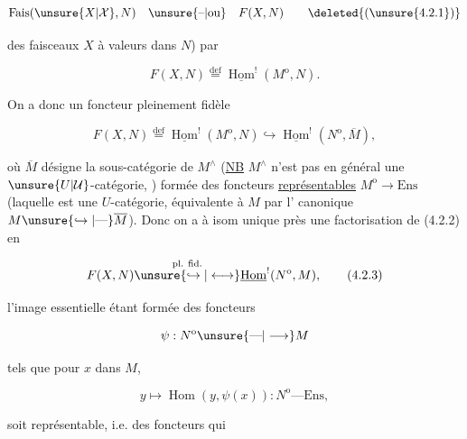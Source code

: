 
\[
\operatorname{Fais}(\unsure{X|\mathcal X},N)\quad\unsure{\text{--}|\text{ou}}\quad F(X,N)
\tag*{\deleted{(\unsure{4.2.1})}}
\]

des faisceaux  $X$ à valeurs dans $N$) par

\[
F(X,N)\overset{\mathrm{def}}{=}\underline{\operatorname{Hom}}^{!}(M^{\mathrm{o}},N).
\tag*{(4.2.1)}
\]

On a donc un foncteur pleinement fidèle

\[
F(X,N)\overset{\mathrm{def}}{=}\underline{\operatorname{Hom}}^{!}(M^{\mathrm{o}},N)
\hookrightarrow\underline{\operatorname{Hom}}^{!}(N^{\mathrm{o}},\overline M),
\tag*{(4.2.2)}
\]

où $\overline M$ désigne la sous-catégorie de $M^{\wedge}$ (\uline{NB} $M^{\wedge}$ n'est pas en général une $\unsure{U|\mathcal U}$-catégorie, ) formée des foncteurs \uline{représentables}  $M^{\mathrm{o}}\to\mathrm{Ens}$ (laquelle est une $U$-catégorie, équivalente à $M$ par l' canonique $M\unsure{\hookrightarrow|\text{---}}\overline M$). Donc on a à isom unique près une factorisation de (4.2.2) en

\[
F(X,N)\overset{\text{pl. fid.}}{\unsure{\hookrightarrow|\longleftrightarrow}}
\underline{\operatorname{Hom}}^{!}(N^{\mathrm{o}},M),
\tag*{(4.2.3)}
\]

l'image essentielle étant formée des foncteurs

\[
\psi:N^{\mathrm{o}}\unsure{\text{---}|\longrightarrow}M
\]

tels que pour  $x$ dans $M$,

\[
y\longmapsto\operatorname{Hom}(y,\psi(x)):N^{\mathrm{o}}\text{---}\mathrm{Ens},
\]

soit représentable, i.e. des foncteurs qui
